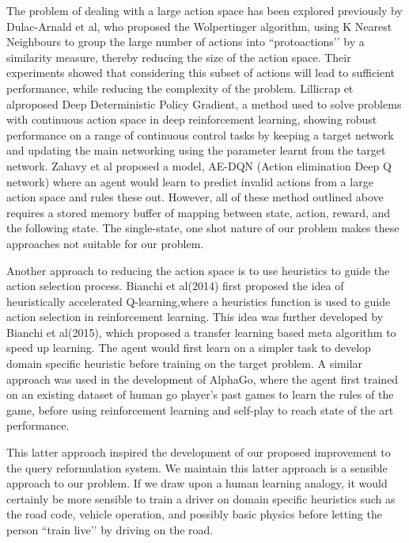The problem of dealing with a large action space has been explored previously by Dulac-Arnald et al\cite{dulac2015deep}, who proposed the Wolpertinger algorithm, using K Nearest Neighbours to group the large number of actions into ``protoactions’’ by a similarity measure, thereby reducing the size of the action space. Their experiments showed that considering this subset of actions will lead to sufficient performance, while reducing the complexity of the problem. Lillicrap et al\cite{lillicrap2015continuous}proposed Deep Deterministic Policy Gradient, a method used to solve problems with continuous action space in deep reinforcement learning, showing robust performance on a range of continuous control tasks by keeping a target network and updating the main networking using the parameter learnt from the target network. Zahavy et al\cite{zahavy2018learn} proposed a model, AE-DQN (Action elimination Deep Q network) where an agent would learn to predict invalid actions from a large action space and rules these out. However, all of these method outlined above requires a stored memory buffer of mapping between state, action, reward, and the following state. The single-state, one shot nature of our problem makes these approaches not suitable for our problem. 

Another approach to reducing the action space is to use heuristics to guide the action selection process. Bianchi et al(2014) \cite{bianchi2004heuristically}first proposed the idea of heuristically accelerated Q-learning,where a heuristics function is used to guide action selection in reinforcement learning. This idea was further developed by Bianchi et al(2015)\cite{bianchi2015transferring}, which proposed a transfer learning based meta algorithm to speed up learning. The agent would first learn on a simpler task to develop domain specific heuristic before training on the target problem. A similar approach was used in the development of AlphaGo\cite{silver2016mastering}, where the agent first trained on an existing dataset of human go player’s past games to learn the rules of the game, before using reinforcement learning and self-play to reach state of the art performance. 

This latter approach inspired the development of our proposed improvement to the query reformulation system. We maintain this latter approach is a sensible approach to our problem. If we draw upon a human learning analogy, it would certainly be more sensible to train a driver on domain specific heuristics such as the road code, vehicle operation, and possibly basic physics before letting the person ``train live’’ by driving on the road.

